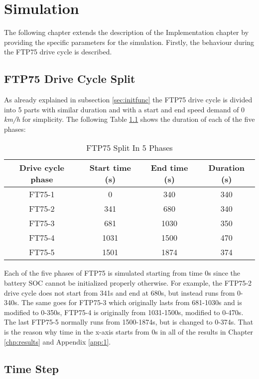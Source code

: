 \chapter{Simulation}
\label{chp:simulation}
The following chapter extends the description of the Implementation chapter by providing the specific parameters for the simulation. Firstly, the behaviour during the FTP75 drive cycle is described.

\section{FTP75 Drive Cycle Split}
As already explained in subsection \ref{sec:initfunc} the FTP75 drive cycle is divided into 5 parts with similar duration and with a start and end speed demand of 0 \textit{km/h} for simplicity. The following Table \ref{tab:drivecyclephases} shows the duration of each of the five phases:

\begin{table}
\centering
\begin{tabular}{ |c|c|c|c| } 
 \hline
 Drive cycle phase & Start time (s) & End time (s) & Duration (s) \\
 \hline\hline
 FT75-1 & 0 & 340 & 340\\ 
 FT75-2 & 341 & 680 & 340\\ 
 FT75-3 & 681 & 1030 & 350\\ 
 FT75-4 & 1031 & 1500 & 470\\ 
 FT75-5 & 1501 & 1874 & 374\\ 
 \hline
\end{tabular}
\caption{FTP75 Split In 5 Phases}
\label{tab:drivecyclephases}
\end{table}

Each of the five phases of FTP75 is simulated starting from time 0s since the battery SOC cannot be initialized properly otherwise. For example, the FTP75-2 drive cycle does not start from 341s and end at 680s, but instead runs from 0-340s. The same goes for FTP75-3 which originally lasts from 681-1030s and is modified to 0-350s, FTP75-4 is originally from 1031-1500s, modified to 0-470s. The last FTP75-5 normally runs from 1500-1874s, but is changed to 0-374s. That is the reason why time in the x-axis starts from 0s in all of the results in Chapter \ref{chp:results} and Appendix \ref{app:1}.

\section{Time Step}

